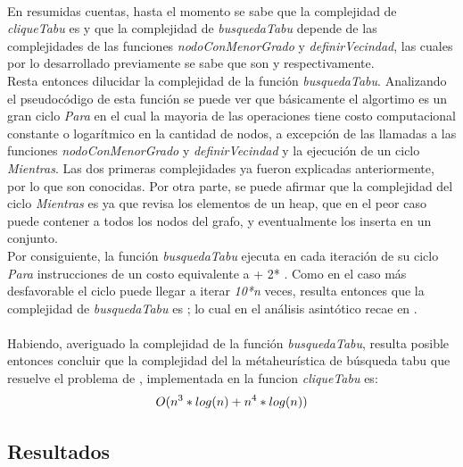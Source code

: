 \paragraph{}
En resumidas cuentas, hasta el momento se sabe que la complejidad de \textit{cliqueTabu} es  y que la complejidad de \textit{busquedaTabu} depende de las complejidades de las funciones \textit{nodoConMenorGrado} y \textit{definirVecindad}, las cuales por lo desarrollado previamente se sabe que son  y  respectivamente.\\
Resta entonces dilucidar la complejidad de la función \textit{busquedaTabu}. Analizando el pseudocódigo de esta función se puede ver que básicamente el algortimo es un gran ciclo \textit{Para} en el cual la mayoria de las operaciones tiene costo computacional constante o logarítmico en la cantidad de nodos, a excepción de las llamadas a las funciones \textit{nodoConMenorGrado} y \textit{definirVecindad} y la ejecución de un ciclo \textit{Mientras}. Las dos primeras complejidades ya fueron explicadas anteriormente, por lo que son conocidas. Por otra parte, se puede afirmar que la complejidad del ciclo \textit{Mientras} es  ya que revisa los elementos de un heap, que en el peor caso puede contener a todos los nodos del grafo, y eventualmente los inserta en un conjunto. \\
Por consiguiente, la función \textit{busquedaTabu} ejecuta en cada iteración de su ciclo \textit{Para} instrucciones de un costo equivalente a  + 2* . Como en el caso más desfavorable el ciclo puede llegar a iterar \textit{10*n} veces, resulta entonces que la complejidad de \textit{busquedaTabu} es ; lo cual en el análisis asintótico recae en .

\paragraph{}
Habiendo, averiguado la complejidad de la función \textit{busquedaTabu}, resulta posible entonces concluir que la complejidad del la métaheurística de búsqueda tabu que resuelve el problema de \mc, implementada en la funcion \textit{cliqueTabu} es: $$O(n^3*log(n) + n^4*log(n))$$

\subsection{Resultados}

